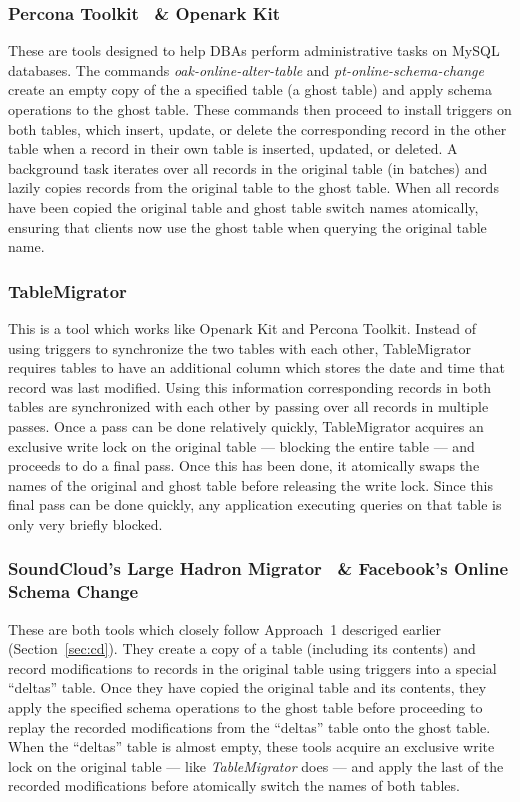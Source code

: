 \documentclass[conference]{IEEEtran}
\begin{document}
\subsubsection{Percona Toolkit~\cite{PerconaToolkit} \& Openark Kit~\cite{OpenarkKit}}
These are tools designed to help DBAs perform administrative tasks on MySQL databases. The commands \textit{oak-online-alter-table} and \textit{pt-online-schema-change} create an empty copy of the a specified table (a ghost table) and apply schema operations to the ghost table. These commands then proceed to install triggers on both tables, which insert, update, or delete the corresponding record in the other table when a record in their own table is inserted, updated, or deleted. A background task iterates over all records in the original table (in batches) and lazily copies records from the original table to the ghost table. When all records have been copied the original table and ghost table switch names atomically, ensuring that clients now use the ghost table when querying the original table name.

\subsubsection{TableMigrator~\cite{TableMigrator}}
This is a tool which works like Openark Kit and Percona Toolkit. Instead of using triggers to synchronize the two tables with each other,  TableMigrator requires tables to have an additional column which stores the date and time that record was last modified. Using this information corresponding records in both tables are synchronized with each other by passing over all records in multiple passes. Once a pass can be done relatively quickly, TableMigrator acquires an exclusive write lock on the original table --- blocking the entire table --- and proceeds to do a final pass. Once this has been done, it atomically swaps the names of the original and ghost table before releasing the write lock. Since this final pass can be done quickly, any application executing queries on that table is only very briefly blocked.

\subsubsection{SoundCloud's Large Hadron Migrator~\cite{SoundcloudLHM} \& Facebook's Online Schema Change~\cite{FacebookOSC}}
These are both tools which closely follow Approach~1 descriged earlier (Section~\ref{sec:cd}). They create a copy of a table (including its contents) and record modifications to records in the original table using triggers into a special ``deltas'' table. Once they have copied the original table and its contents, they apply the specified schema operations to the ghost table before proceeding to replay the recorded modifications from the ``deltas'' table onto the ghost table. When the ``deltas'' table is almost empty, these tools acquire an exclusive write lock on the original table --- like \textit{TableMigrator} does --- and apply the last of the recorded modifications before atomically switch the names of both tables.
\end{document}
